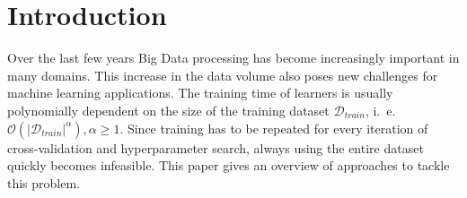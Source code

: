\section{Introduction}%
\label{sec:intro}

\setcounter{page}{1}			%

Over the last few years Big Data processing has become increasingly important in many domains.
This increase in the data volume also poses new challenges for machine learning applications.
The training time of learners is usually polynomially dependent on the size of the training dataset \(\mathcal{D}_{\mathit{train}}\), i.~e. \(\mathcal{O}(|\mathcal{D}_{\mathit{train}}|^\alpha), \alpha \geq 1\).
Since training has to be repeated for every iteration of cross-validation and hyperparameter search, always using the entire dataset quickly becomes infeasible.
This paper gives an overview of approaches to tackle this problem.


